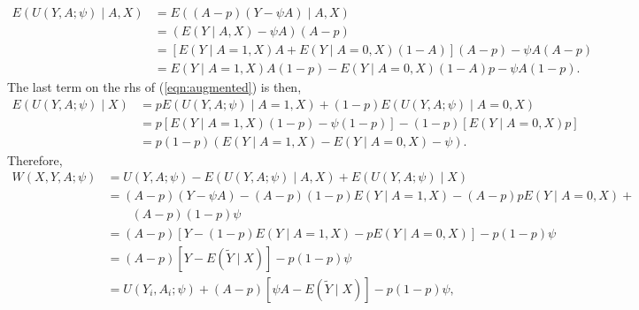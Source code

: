 \message{ !name(manuscript.tex)}\documentclass[10pt,a4paper]{amsart}
\newcommand{\EE}{E}
\newcommand{\E}[1]{\EE(Y\mid A=#1,X)}
\begin{document}
\begin{align*}
  \EE(U(Y,A;\psi)\mid A,X) &= \EE((A-p)(Y-\psi A)\mid A,X)\\
                           &= (\EE(Y\mid A,X)-\psi A)(A-p)\\
                           &=[\EE(Y\mid A=1,X)A + \EE(Y\mid A=0,X)(1-A)](A-p) - \psi A(A-p)\\
                           &= \EE(Y\mid A=1,X)A(1-p) - \EE(Y\mid A=0,X)(1-A)p - \psi A(1-p).
\end{align*}
The last term on the rhs of (\ref{eqn:augmented}) is then,
\begin{align*}
  \EE(U(Y,A;\psi)\mid X) &= p  \EE(U(Y,A;\psi)\mid A=1,X) + (1-p)  \EE(U(Y,A;\psi)\mid A=0,X)\\
                         &= p[\EE(Y\mid A=1,X)(1-p) - \psi (1-p)] - (1-p)[\EE(Y\mid A=0,X)p]\\
                         &= p(1-p)(\EE(Y\mid A=1,X) - \EE(Y\mid A=0,X) - \psi).
\end{align*}
Therefore,
\begin{align*}
  W(X,Y,A;\psi) &= U(Y,A;\psi) - \EE(U(Y,A;\psi)\mid A,X) + \EE(U(Y,A;\psi)\mid X)\\
                &= (A-p)(Y-\psi A) - (A-p)(1-p)\EE(Y\mid A=1,X) - (A-p) p\EE(Y\mid A=0,X) + \\
                &\qquad (A-p)(1-p)\psi\\
                &= (A-p)[Y - (1-p)\EE(Y\mid A=1,X) - p\EE(Y\mid A=0,X)] - p(1-p)\psi\\
&= (A-p)[Y - \EE(\tilde{Y}\mid X)] - p(1-p)\psi\\
                &= U(Y_i,A_i;\psi) + (A-p)[\psi A - \EE(\tilde{Y}\mid X)] - p(1-p)\psi,
\end{align*}
\end{document}
